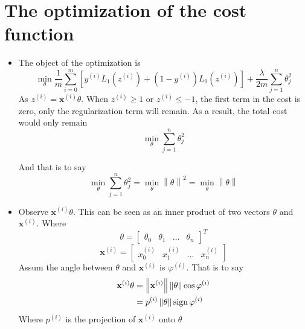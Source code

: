 \section{The optimization of the cost function}
\begin{itemize}
\item The object of the optimization is
\begin{equation} \min_\theta \frac{1}{m} \sum_{i=0}^{m} \left[y^{(i)} L_1(z^{(i)}) + (1-y^{(i)}) L_0(z^{(i)}) \right] + \frac{\lambda}{2m} \sum_{j=1}^{n} \theta_j^2 \end{equation}
As $z^{(i)} = \mathbf{x}^{(i)}\theta$. When $z^{(i)} \geq 1$ or $z^{(i)} \leq -1$, the first term in the cost is zero, only the regularization term will remain.
As a result, the total cost would only remain
\begin{equation} \min_\theta \sum_{j=1}^{n} \theta_j^2 \end{equation}

And that is to say
\begin{equation}
    \min_\theta \sum_{j=1}^{n} \theta_j^2 = \min_\theta{\left\|\theta\right\|}^2 = \min_\theta{\left\|\theta\right\|}
\end{equation}

\item Observe $\mathbf{x}^{(i)}\theta$. This can be seen as an inner product of two vectors $\theta$ and $\mathbf{x}^{(i)}$. Where
\begin{equation} \theta = \left[{\begin{matrix} \theta_0 & \theta_1 & \dots & \theta_n \end{matrix}}\right]^T \end{equation}
\begin{equation} \mathbf{x}^{(i)} = \left[{\begin{matrix} x_0^{(i)} & x_1^{(i)} & \dots & x_n^{(i)} \end{matrix}}\right] \end{equation}
Assum the angle between $\theta$ and $\mathbf{x}^{(i)}$ is $\varphi^{(i)}$. That is to say
\begin{equation}
    \begin{aligned}
        \mathbf{x}^{(i)}\theta &= \left\| \mathbf{x}^{(i)} \right\| \left\| \theta \right\| \cos\varphi^{(i)} \\
                               &= p^{(i)} \left\| \theta \right\| \operatorname{sign}\varphi^{(i)}
    \end{aligned}
\end{equation}
Where $p^{(i)}$ is the projection of $\mathbf{x}^{(i)}$ onto $\theta$


\end{itemize}
